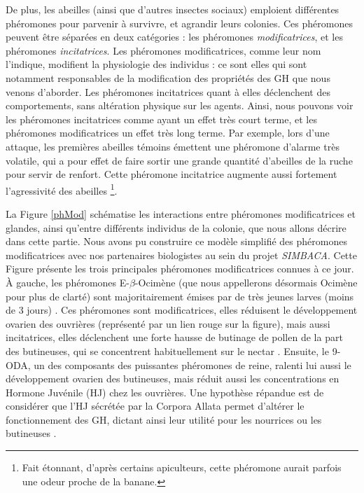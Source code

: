 			De plus, les abeilles (ainsi que d'autres insectes sociaux) emploient différentes phéromones pour parvenir à survivre, et agrandir leurs colonies. Ces phéromones peuvent être séparées en deux catégories : les phéromones \textit{modificatrices}, et les phéromones \textit{incitatrices}. Les phéromones modificatrices, comme leur nom l'indique, modifient la physiologie des individus : ce sont elles qui sont notamment responsables de la modification des propriétés des GH que nous venons d'aborder. Les phéromones incitatrices quant à elles déclenchent des comportements, sans altération physique sur les agents. Ainsi, nous pouvons voir les phéromones incitatrices comme ayant un effet très court terme, et les phéromones modificatrices un effet très long terme. Par exemple, lors d'une attaque, les premières abeilles témoins émettent une phéromone d'alarme très volatile, qui a pour effet de faire sortir une grande quantité d'abeilles de la ruche pour servir de renfort. Cette phéromone incitatrice augmente aussi fortement l'agressivité des abeilles \footnote{Fait étonnant, d'après certains apiculteurs, cette phéromone aurait parfois une odeur proche de la banane.}.
			
			La Figure \ref{phMod} schématise les interactions entre phéromones modificatrices et glandes, ainsi qu'entre différents individus de la colonie, que nous allons décrire dans cette partie. Nous avons pu construire ce modèle simplifié des phéromones modificatrices avec nos partenaires biologistes au sein du projet \textit{SIMBACA}. Cette Figure présente les trois principales phéromones modificatrices connues à ce jour. À gauche, les phéromones E-$\beta$-Ocimène (que nous appellerons désormais Ocimène pour plus de clarté) sont majoritairement émises par de très jeunes larves (moins de 3 jours) \cite{maisonnasse_e-b-ocimene_2010}. Ces phéromones sont modificatrices, elles réduisent le développement ovarien des ouvrières (représenté par un lien rouge sur la figure), mais aussi incitatrices, elles déclenchent une forte hausse de butinage de pollen de la part des butineuses, qui se concentrent habituellement sur le nectar \cite{maisonnasse_e-b-ocimene_2010}. Ensuite, le 9-ODA, un des composants des puissantes phéromones de reine, ralenti lui aussi le développement ovarien des butineuses, mais réduit aussi les concentrations en Hormone Juvénile (HJ) chez les ouvrières. Une hypothèse répandue est de considérer que l'HJ sécrétée par la Corpora Allata permet d'altérer le fonctionnement des GH, dictant ainsi leur utilité pour les nourrices ou les butineuses \cite{robinson_colony_1998}.
			 
